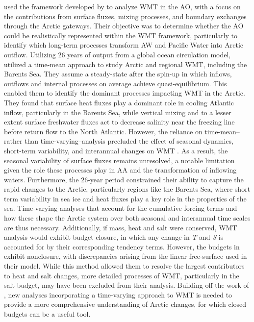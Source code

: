 \documentclass[draft]{agujournal2019}
\begin{document}
 used the framework developed by  to analyze WMT in the AO, with a focus on the contributions from surface fluxes, mixing processes, and boundary exchanges through the Arctic gateways. Their objective was to determine whether the AO could be realistically represented within the WMT framework, particularly to identify which long-term processes transform AW and Pacific Water into Arctic outflow. Utilizing 26 years of output from a global ocean circulation model,  utilized a time-mean approach to study Arctic and regional WMT, including the Barents Sea. They assume a steady-state after the spin-up in which inflows, outflows and internal processes on average achieve quasi-equilibrium. This enabled them to identify the dominant processes impacting WMT in the Arctic. They found that surface heat fluxes play a dominant role in cooling Atlantic inflow, particularly in the Barents Sea, while vertical mixing and to a lesser extent surface freshwater fluxes act to decrease salinity near the freezing line before return flow to the North Atlantic. However, the reliance on time-mean--rather than time-varying--analysis precluded the effect of seasonal dynamics, short-term variability, and interannual changes on WMT \cite{Tsubouchi2018}. As a result, the seasonal variability of surface fluxes remains unresolved, a notable limitation given the role these processes play in AA and the transformation of inflowing waters. Furthermore, the 26-year period constrained their ability to capture the rapid changes to the Arctic, particularly regions like the Barents Sea, where short term variability in sea ice and heat fluxes play a key role in the properties of the sea. Time-varying analyses that account for the cumulative forcing terms and how these shape the Arctic system over both seasonal and interannual time scales are thus necessary. Additionally, if mass, heat and salt were conserved, WMT analysis would exhibit budget closure, in which any change in \emph{T} and \emph{S} is accounted for by their corresponding tendency terms. However, the budgets in  exhibit nonclosure, with discrepancies arising from the linear free-surface used in their model. While this method allowed them to resolve the largest contributors to heat and salt changes, more detailed processes of WMT, particularly in the salt budget, may have been excluded from their analysis. Building off the work of , new analyses incorporating a time-varying approach to WMT is needed to provide a more comprehensive understanding of Arctic changes, for which closed budgets can be a useful tool.
\end{document}
